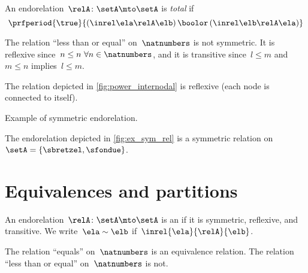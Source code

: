 \begin{ctdefinition}
    \label{def:endo_total}
    An endorelation~$\relA\colon \setA\mto \setA$ is \emph{total} if
    \begin{equation}
        \prfperiod{
            \true
        }{
            (\inrel\ela\relA\elb )\,\boolor\, (\inrel\elb\relA\ela)
        }
    \end{equation}

\end{ctdefinition}

\begin{example}
    The relation ``less than or equal'' on~$\natnumbers$ is not symmetric.
    It is reflexive since~$n\leq n \ \forall n\in \natnumbers$, and it is transitive since~$l\leq m$ and~$m\leq n$ implies~$l\leq m$.
\end{example}

\begin{example}
    The relation depicted in \cref{fig:power_internodal} is reflexive (each node is connected to itself).
\end{example}
\begin{marginfigure}
    \centering
    \caption{Example of symmetric endorelation.}
    \label{fig:ex_sym_rel}
\end{marginfigure}
\begin{example}
    The endorelation depicted in \cref{fig:ex_sym_rel} is a symmetric relation on~$\setA=\{\sbretzel,\sfondue\}$.
\end{example}

\section{Equivalences and partitions}
\begin{ctdefinition}
    \label{def:equivalence-relation}
    An endorelation~$\relA\colon \setA\mto \setA$ is an \emph{} if it is symmetric, reflexive, and transitive.
    We write~$\ela\sim \elb$ if~$\inrel{\ela}{\relA}{\elb}$.
\end{ctdefinition}

\begin{example}
    The relation ``equals'' on~$\natnumbers$ is an equivalence relation.
    The relation ``less than or equal'' on~$\natnumbers$ is not.
\end{example}

